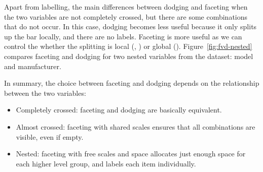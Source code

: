 % 


Apart from labelling, the main differences between dodging and faceting when the two variables are not completely crossed, but there are some combinations that do not occur.  In this case, dodging becomes less useful because it only splits up the bar locally, and there are no labels.  Faceting is more useful as we can control the whether the splitting is local (, ) or global ().  Figure~\ref{fig:fvd-nested} compares faceting and dodging for two nested variables from the  dataset: model and manufacturer.

In summary, the choice between faceting and dodging depends on the relationship between the two variables:

\begin{itemize}
  \item Completely crossed: faceting and dodging are basically equivalent.

  \item Almost crossed: faceting with shared scales ensures that all combinations are visible, even if empty.

  \item Nested: faceting with free scales and space allocates just enough space for each higher level group, and labels each item individually.
\end{itemize}

% 


